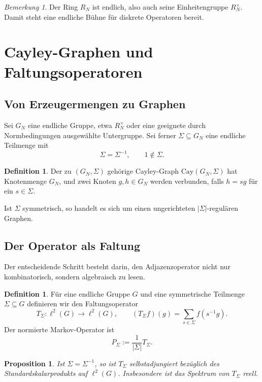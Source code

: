 \documentclass[12pt,a4paper]{article}
\theoremstyle{plain}
\newtheorem{proposition}[satz]{Proposition}
\theoremstyle{definition}
\newtheorem{definition}[satz]{Definition}
\theoremstyle{remark}
\newtheorem{bemerkung}[satz]{Bemerkung}
\begin{document}
	\begin{bemerkung}
		Der Ring \(R_N\) ist endlich, also auch seine Einheitengruppe \(R_N^\times\).
		Damit steht eine endliche Bühne für diskrete Operatoren bereit.
	\end{bemerkung}
	
	\section{Cayley-Graphen und Faltungsoperatoren}
	
	\subsection{Von Erzeugermengen zu Graphen}
	
	Sei \(G_N\) eine endliche Gruppe, etwa \(R_N^\times\) oder
	eine geeignete durch Normbedingungen ausgewählte Untergruppe.
	Sei ferner \(\Sigma \subseteq G_N\) eine endliche Teilmenge mit
	\[
	\Sigma=\Sigma^{-1}, \qquad 1\notin \Sigma.
	\]
	
	\begin{definition}
		Der zu \((G_N,\Sigma)\) gehörige Cayley-Graph \(\mathrm{Cay}(G_N,\Sigma)\)
		hat Knotenmenge \(G_N\), und zwei Knoten \(g,h\in G_N\) werden verbunden,
		falls \(h=sg\) für ein \(s\in \Sigma\).
	\end{definition}
	
	Ist \(\Sigma\) symmetrisch, so handelt es sich um einen ungerichteten
	\(|\Sigma|\)-regulären Graphen.
	
	\subsection{Der Operator als Faltung}
	
	Der entscheidende Schritt besteht darin, den Adjazenzoperator nicht nur
	kombinatorisch, sondern algebraisch zu lesen.
	
	\begin{definition}
		Für eine endliche Gruppe \(G\) und eine symmetrische Teilmenge \(\Sigma\subseteq G\)
		definieren wir den Faltungsoperator
		\[
		T_\Sigma : \ell^2(G)\to \ell^2(G),\qquad
		(T_\Sigma f)(g)=\sum_{s\in \Sigma} f(s^{-1}g).
		\]
		Der normierte Markov-Operator ist
		\[
		P_\Sigma := \frac{1}{|\Sigma|}T_\Sigma.
		\]
	\end{definition}
	
	\begin{proposition}
		Ist \(\Sigma=\Sigma^{-1}\), so ist \(T_\Sigma\) selbstadjungiert
		bezüglich des Standardskalarprodukts auf \(\ell^2(G)\).
		Insbesondere ist das Spektrum von \(T_\Sigma\) reell.
	\end{proposition}
	
\end{document}
